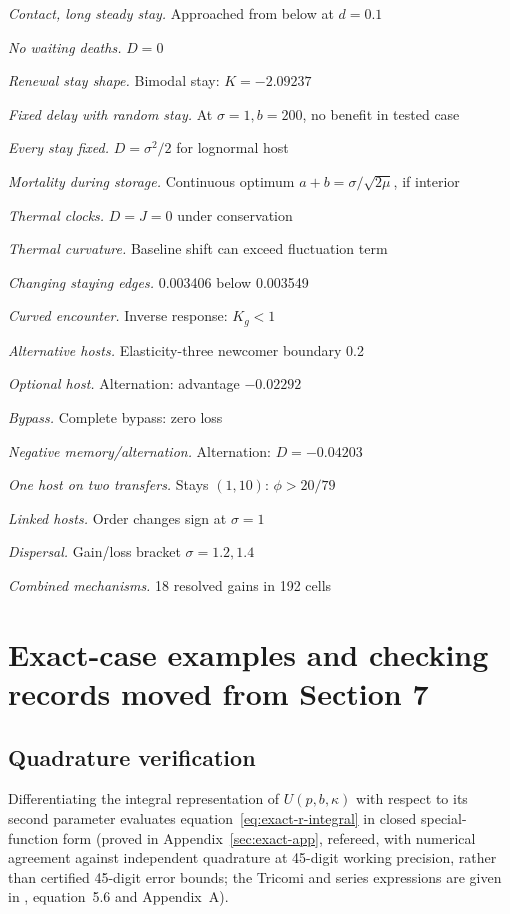 \noindent\textit{Contact, long steady stay.} Approached from below at \(d=0.1\)

\noindent\textit{No waiting deaths.} \(D=0\)

\noindent\textit{Renewal stay shape.} Bimodal stay: \(K=-2.09237\)

\noindent\textit{Fixed delay with random stay.} At \(\sigma=1,b=200\), no benefit in tested case

\noindent\textit{Every stay fixed.} \(D=\sigma^2/2\) for lognormal host

\noindent\textit{Mortality during storage.} Continuous optimum \(a+b=\sigma/\sqrt{2\mu}\), if interior

\noindent\textit{Thermal clocks.} \(D=J=0\) under conservation

\noindent\textit{Thermal curvature.} Baseline shift can exceed fluctuation term

\noindent\textit{Changing staying edges.} 0.003406 below 0.003549

\noindent\textit{Curved encounter.} Inverse response: \(K_g<1\)

\noindent\textit{Alternative hosts.} Elasticity-three newcomer boundary 0.2

\noindent\textit{Optional host.} Alternation: advantage \(-0.02292\)

\noindent\textit{Bypass.} Complete bypass: zero loss

\noindent\textit{Negative memory/alternation.} Alternation: \(D=-0.04203\)

\noindent\textit{One host on two transfers.} Stays \((1,10)\): \(\phi>20/79\)

\noindent\textit{Linked hosts.} Order changes sign at \(\sigma=1\)

\noindent\textit{Dispersal.} Gain/loss bracket \(\sigma=1.2,1.4\)

\noindent\textit{Combined mechanisms.} 18 resolved gains in 192 cells


\section{Exact-case examples and checking records moved from Section 7}\label{esm:from-main-exact}

\subsection{Quadrature verification}\label{esm:exact-quadrature}

Differentiating the integral representation of $U(p,b,\kappa)$ with respect to its second parameter evaluates equation~\eqref{eq:exact-r-integral} in closed special-function form (proved in Appendix~\ref{sec:exact-app}, refereed, with numerical agreement against independent quadrature at 45-digit working precision, rather than certified 45-digit error bounds; the Tricomi and series expressions are given in \citealp{roerdink1988}, equation~5.6 and Appendix~A).

